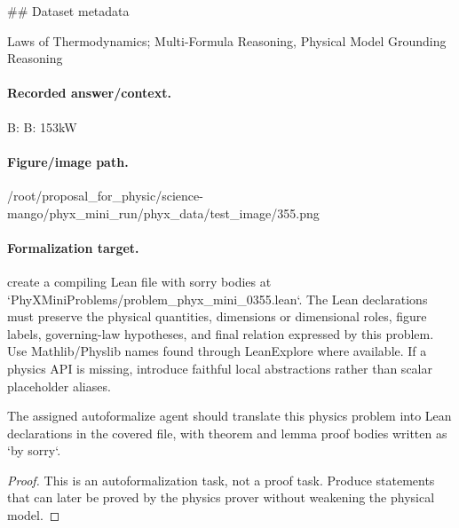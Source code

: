 \#\# Dataset metadata

Laws of Thermodynamics; Multi-Formula Reasoning, Physical Model Grounding Reasoning

\paragraph{Recorded answer/context.}
B: B: 153kW

\paragraph{Figure/image path.}
/root/proposal\_for\_physic/science-mango/phyx\_mini\_run/phyx\_data/test\_image/355.png

\paragraph{Formalization target.}
create a compiling Lean file with sorry bodies at `PhyXMiniProblems/problem\_phyx\_mini\_0355.lean`. The Lean declarations must preserve the physical quantities, dimensions or dimensional roles, figure labels, governing-law hypotheses, and final relation expressed by this problem.
Use Mathlib/Physlib names found through LeanExplore where available. If a physics API is missing, introduce faithful local abstractions rather than scalar placeholder aliases.

\begin{theorem}
\label{thm:physics:phyx_mini_0355:target}
The assigned autoformalize agent should translate this physics problem into Lean declarations in the covered file, with theorem and lemma proof bodies written as `by sorry`.
\end{theorem}
\begin{proof}
This is an autoformalization task, not a proof task. Produce statements that can later be proved by the physics prover without weakening the physical model.
\end{proof}

